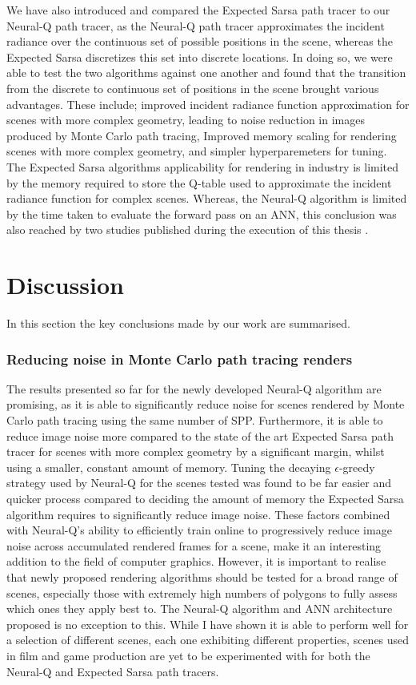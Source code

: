 \documentclass[../dissertation.tex]{subfiles}
\begin{document}
We have also introduced and compared the Expected Sarsa path tracer to our Neural-Q path tracer, as the Neural-Q path tracer approximates the incident radiance over the continuous set of possible positions in the scene, whereas the Expected Sarsa discretizes this set into discrete locations. In doing so, we were able to test the two algorithms against one another and found that the transition from the discrete to continuous set of positions in the scene brought various advantages. These include; improved incident radiance function approximation for scenes with more complex geometry, leading to noise reduction in images produced by Monte Carlo path tracing, Improved memory scaling for rendering scenes with more complex geometry, and simpler hyperparemeters for tuning. The Expected Sarsa algorithms applicability for rendering in industry is limited by the memory required to store the Q-table used to approximate the incident radiance function for complex scenes. Whereas, the Neural-Q algorithm is limited by the time taken to evaluate the forward pass on an ANN, this conclusion was also reached by two studies published during the execution of this thesis \cite{}.

\section{Discussion}

In this section the key conclusions made by our work are summarised. 

\subsubsection*{Reducing noise in Monte Carlo path tracing renders}
The results presented so far for the newly developed Neural-Q algorithm are promising, as it is able to significantly reduce noise for scenes rendered by Monte Carlo path tracing using the same number of SPP. Furthermore, it is able to reduce image noise more compared to the state of the art Expected Sarsa path tracer for scenes with more complex geometry by a significant margin, whilst using a smaller, constant amount of memory. Tuning the decaying $\epsilon$-greedy strategy used by Neural-Q for the scenes tested was found to be far easier and quicker process compared to deciding the amount of memory the Expected Sarsa algorithm requires to significantly reduce image noise. These factors combined with  Neural-Q's ability to efficiently train online to progressively reduce image noise across accumulated rendered frames for a scene, make it an interesting addition to the field of computer graphics. However, it is important to realise that newly proposed rendering algorithms should be tested for a broad range of scenes, especially those with extremely high numbers of polygons to fully assess which ones they apply best to. The Neural-Q algorithm and ANN architecture proposed is no exception to this. While I have shown it is able to perform well for a selection of different scenes, each one exhibiting different properties, scenes used in film and game production are yet to be experimented with for both the Neural-Q and Expected Sarsa path tracers.
\end{document}
